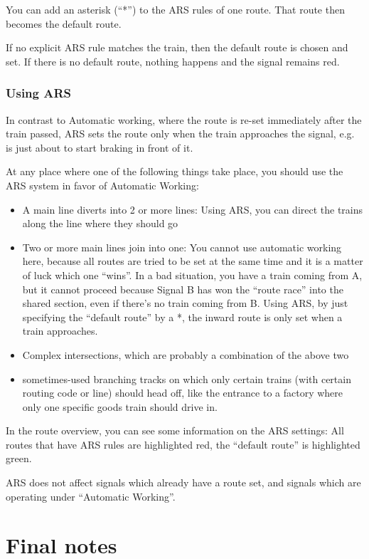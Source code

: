 \documentclass[english]{paper}
\begin{document}
You can add an asterisk (``{*}'') to the ARS rules of one route.
That route then becomes the default route.

If no explicit ARS rule matches the train, then the default route
is chosen and set. If there is no default route, nothing happens and
the signal remains red.

\subsubsection{Using ARS}

In contrast to Automatic working, where the route is re-set immediately
after the train passed, ARS sets the route only when the train approaches
the signal, e.g. is just about to start braking in front of it.

At any place where one of the following things take place, you should
use the ARS system in favor of Automatic Working:
\begin{itemize}
\item A main line diverts into 2 or more lines: Using ARS, you can direct
the trains along the line where they should go
\item Two or more main lines join into one: You cannot use automatic working
here, because all routes are tried to be set at the same time and
it is a matter of luck which one ``wins''. In a bad situation, you
have a train coming from A, but it cannot proceed because Signal B
has won the ``route race'' into the shared section, even if there's
no train coming from B. Using ARS, by just specifying the ``default
route'' by a {*}, the inward route is only set when a train approaches.
\item Complex intersections, which are probably a combination of the above
two
\item sometimes-used branching tracks on which only certain trains (with
certain routing code or line) should head off, like the entrance to
a factory where only one specific goods train should drive in.
\end{itemize}
In the route overview, you can see some information on the ARS settings:
All routes that have ARS rules are highlighted red, the ``default
route'' is highlighted green.

ARS does not affect signals which already have a route set, and signals
which are operating under ``Automatic Working''.

\section{Final notes}
\end{document}

